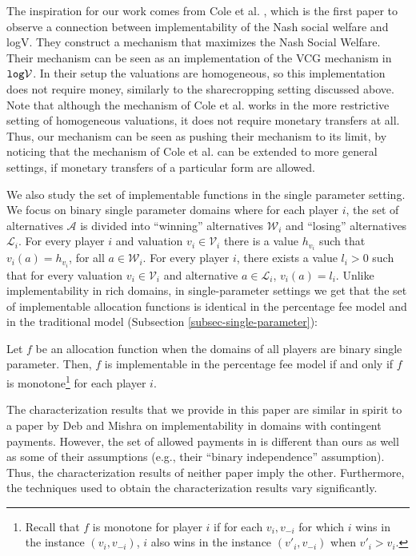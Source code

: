 \documentclass{theoretics}
\newcommand{\cV}{{\mathcal V}}
\begin{document}
The inspiration for our work comes from Cole et al. \cite{CGG13}, which is the first paper to observe a connection between implementability of the Nash social welfare and logV. They construct a mechanism that maximizes the Nash Social Welfare. Their mechanism can be seen as an implementation of the VCG mechanism in $ {\tt log} \cV$. In their setup the valuations are homogeneous, so this implementation does not require money, similarly to the sharecropping setting discussed above. {Note that although the mechanism of Cole et al. \cite{CGG13} works in the more restrictive setting of homogeneous valuations, it does not require monetary transfers at all. Thus, our mechanism can be seen as pushing their mechanism to its limit, by noticing that the mechanism of Cole et al. \cite{CGG13} can be extended to more general settings, if monetary transfers of a particular form are allowed}.


We also study the set of implementable functions in the single parameter setting. We focus on binary single parameter domains where  for each player $i$, the set of alternatives $\mathcal A$ is divided into ``winning'' alternatives $\mathcal W_i$ and ``losing'' alternatives $\mathcal L_i$. For every player $i$ and valuation $v_i\in \mathcal V_i$ there is a value $h_{v_i}$ such that $v_i(a)=h_{v_i}$, for all $a\in \mathcal W_i$. For every player $i$, there exists a value $l_i>0$ such that for every valuation $v_i\in \mathcal V_i$ and alternative $a\in \mathcal L_i$, $v_i(a)=l_i$. Unlike implementability in rich domains, in single-parameter settings we get that the set of implementable allocation functions is identical in the percentage fee model and in the traditional model (Subsection \ref{subsec-single-parameter}):

\begin{theorem*}
Let $f$ be an allocation function when the domains of all players are binary single parameter. Then, $f$ is implementable in the percentage fee model if and only if $f$ is monotone\footnote{Recall that $f$ is monotone for player $i$ if for each $v_i, v_{-i}$ for which $i$ wins in the instance $(v_i,v_{-i})$, $i$ also wins in the instance $(v'_i,v_{-i})$ when $v'_i>v_i$.} for each player $i$.    
\end{theorem*}

The characterization results that we provide in this paper are similar in spirit to a paper by Deb and Mishra \cite{DM2014} on implementability in domains with contingent payments. However, the set of allowed payments in \cite{DM2014} is different than ours as well as some of their assumptions (e.g., their ``binary independence'' assumption). Thus, the characterization results of neither paper imply the other. Furthermore, the techniques used to obtain the characterization results vary significantly.
\end{document}
